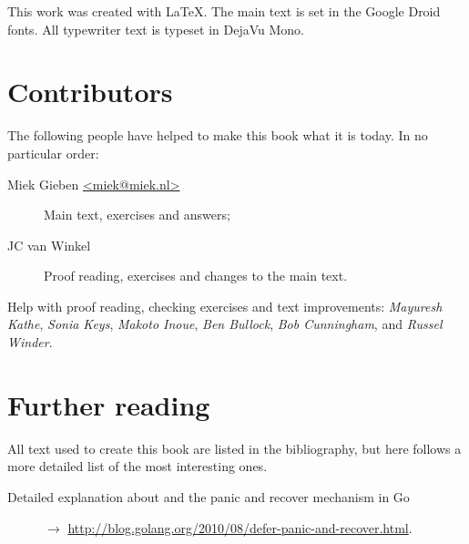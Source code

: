 \noindent{}This work was created with \LaTeX. The main text is set in
the Google Droid fonts. All typewriter text is typeset in DejaVu Mono.

\section{Contributors}
The following people have helped to make this book what it is today.
In no particular order:
\begin{description}
\item[Miek Gieben \qquad\url{<miek@miek.nl>}] 
{Main text, exercises and answers;}
\item[JC van Winkel]
{Proof reading, exercises and changes to the main text.}
\end{description}

Help with proof reading, checking exercises and text improvements:
\emph{Mayuresh Kathe},
\emph{Sonia Keys},
\emph{Makoto Inoue},
\emph{Ben Bullock},
\emph{Bob Cunningham},
and \emph{Russel Winder}.

\section{Further reading}
All text used to create this book are listed in the bibliography, but
here follows a more detailed list of the most interesting ones.
\begin{description}
\item[Detailed explanation about  and the panic and recover
mechanism in Go]{$\rightarrow$
\url{http://blog.golang.org/2010/08/defer-panic-and-recover.html}.}
\end{description}
